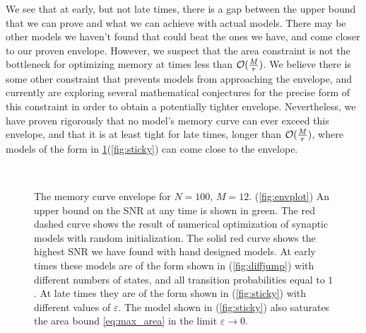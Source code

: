 We see that at early, but not late times, there is a gap between the upper bound that we can prove and what we can achieve with actual models.
There may be other models we haven't found that could beat the ones we have, and come closer to our proven envelope.
However, we suspect that the area constraint is not the bottleneck for optimizing memory at times less than  $\mathcal{O}(\frac{M}{r})$.
We believe there is some other constraint that prevents models from approaching the envelope, and currently are exploring several mathematical conjectures for the precise form of this constraint in order to obtain a potentially tighter envelope.
Nevertheless, we have proven rigorously that no model's memory curve can ever exceed this envelope, and that it is at least tight for late times, longer than $\mathcal{O}(\frac{M}{r})$, where models of the form in \cref{fig:env}(\ref{fig:sticky})%
 can come close to the envelope.

\begin{figure}
 \begin{center}
 \parbox[t]{0.43\linewidth}{%
 \begin{myenuma}
   \label{fig:envplot}
 \end{myenuma}}\hp
 \parbox[t]{0.44\linewidth}{%
 \begin{myenuma}
   \label{fig:diffjump}\\[0.1\linewidth]
   \label{fig:sticky}
 \end{myenuma}}
 \end{center}
  \caption[The memory curve envelope for $N=100$, $M=12$]{The memory curve envelope for $N=100$, $M=12$.
  (\protect\protect\ref{fig:envplot}) An upper bound on the SNR at any time is shown in green.
  The red dashed curve shows the result of numerical optimization of synaptic models with random initialization.
  The solid red curve shows the highest SNR we have found with hand designed models.
  At early times these models are of the form shown in (\ref{fig:diffjump}) with different numbers of states, and all transition probabilities equal to $1$.
  At late times they are of the form shown in (\ref{fig:sticky}) with different values of $\varepsilon$.
  The model shown in (\ref{fig:sticky}) also saturates the area bound \cref{eq:max_area} in the limit $\varepsilon\to0$.
  \label{fig:env}}
\end{figure}







